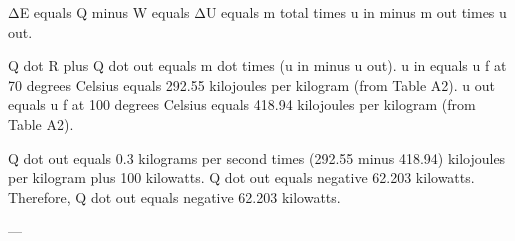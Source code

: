 ΔE equals Q minus W equals ΔU equals m total times u in minus m out times u out.  

Q dot R plus Q dot out equals m dot times (u in minus u out).  
u in equals u f at 70 degrees Celsius equals 292.55 kilojoules per kilogram (from Table A2).  
u out equals u f at 100 degrees Celsius equals 418.94 kilojoules per kilogram (from Table A2).  

Q dot out equals 0.3 kilograms per second times (292.55 minus 418.94) kilojoules per kilogram plus 100 kilowatts.  
Q dot out equals negative 62.203 kilowatts. Therefore, Q dot out equals negative 62.203 kilowatts.  

---